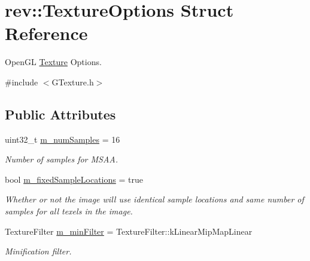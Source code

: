 \hypertarget{structrev_1_1_texture_options}{}\section{rev\+::Texture\+Options Struct Reference}
\label{structrev_1_1_texture_options}


Open\+GL \mbox{\hyperlink{classrev_1_1_texture}{Texture}} Options.  




{\ttfamily \#include $<$G\+Texture.\+h$>$}

\subsection*{Public Attributes}
\begin{DoxyCompactItemize}
\item 
\mbox{\label{structrev_1_1_texture_options_a5d879ee72f649a98b74791653cd7e326}} 
uint32\+\_\+t \mbox{\hyperlink{structrev_1_1_texture_options_a5d879ee72f649a98b74791653cd7e326}{m\+\_\+num\+Samples}} = 16
\begin{DoxyCompactList}\small\item\em Number of samples for M\+S\+AA. \end{DoxyCompactList}\item 
\mbox{\label{structrev_1_1_texture_options_ab8b3e031d2793c1047bd006c605859a7}} 
bool \mbox{\hyperlink{structrev_1_1_texture_options_ab8b3e031d2793c1047bd006c605859a7}{m\+\_\+fixed\+Sample\+Locations}} = true
\begin{DoxyCompactList}\small\item\em Whether or not the image will use identical sample locations and same number of samples for all texels in the image. \end{DoxyCompactList}\item 
\mbox{\label{structrev_1_1_texture_options_a55ff174f871c4ad71de8f543e20b882d}} 
Texture\+Filter \mbox{\hyperlink{structrev_1_1_texture_options_a55ff174f871c4ad71de8f543e20b882d}{m\+\_\+min\+Filter}} = Texture\+Filter\+::k\+Linear\+Mip\+Map\+Linear
\begin{DoxyCompactList}\small\item\em Minification filter. \end{DoxyCompactList}\item 

\end{DoxyCompactItemize}
